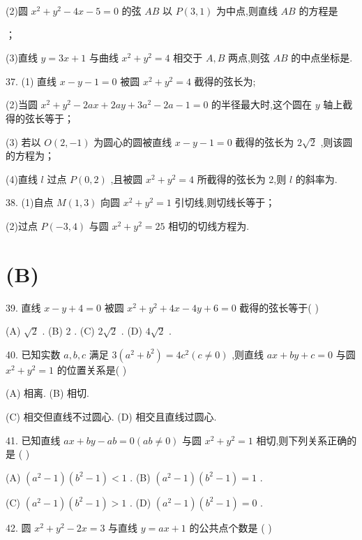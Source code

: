 (2)圆 ${x}^{2} + {y}^{2} - {4x} - 5 = 0$ 的弦 ${AB}$ 以 $P\left( {3,1}\right)$ 为中点,则直线 ${AB}$ 的方程是\blkda{}

\blkda{}；

(3)直线 $y = {3x} + 1$ 与曲线 ${x}^{2} + {y}^{2} = 4$ 相交于 $A,B$ 两点,则弦 ${AB}$ 的中点坐标是\blkda{}.

37. (1) 直线 $x - y - 1 = 0$ 被圆 ${x}^{2} + {y}^{2} = 4$ 截得的弦长为\blkda{};

(2)当圆 ${x}^{2} + {y}^{2} - {2ax} + {2ay} + 3{a}^{2} - {2a} - 1 = 0$ 的半径最大时,这个圆在 $y$ 轴上截得的弦长等于\blkda{}；

(3) 若以 $O\left( {2, - 1}\right)$ 为圆心的圆被直线 $x - y - 1 = 0$ 截得的弦长为 $2\sqrt{2}$ ,则该圆的方程为\blkda{}；

(4)直线 $l$ 过点 $P\left( {0,2}\right)$ ,且被圆 ${x}^{2} + {y}^{2} = 4$ 所截得的弦长为 2,则 $l$ 的斜率为\blkda{}.

38. (1)自点 $M\left( {1,3}\right)$ 向圆 ${x}^{2} + {y}^{2} = 1$ 引切线,则切线长等于\blkda{}；

(2)过点 $P\left( {-3,4}\right)$ 与圆 ${x}^{2} + {y}^{2} = {25}$ 相切的切线方程为\blkda{}.

\section*{(B)}

39. 直线 $x - y + 4 = 0$ 被圆 ${x}^{2} + {y}^{2} + {4x} - {4y} + 6 = 0$ 截得的弦长等于(   )

(A) $\sqrt{2}$ . (B) 2 . (C) $2\sqrt{2}$ . (D) $4\sqrt{2}$ .

40. 已知实数 $a,b,c$ 满足 $3\left( {{a}^{2} + {b}^{2}}\right)  = 4{c}^{2}\left( {c \neq  0}\right)$ ,则直线 ${ax} + {by} + c = 0$ 与圆 ${x}^{2} + {y}^{2} = 1$ 的位置关系是(   )

(A) 相离. (B) 相切.

(C) 相交但直线不过圆心. (D) 相交且直线过圆心.

41. 已知直线 ${ax} + {by} - {ab} = 0\left( {{ab} \neq  0}\right)$ 与圆 ${x}^{2} + {y}^{2} = 1$ 相切,则下列关系正确的是 (   )

(A) $\left( {{a}^{2} - 1}\right) \left( {{b}^{2} - 1}\right)  < 1$ . (B) $\left( {{a}^{2} - 1}\right) \left( {{b}^{2} - 1}\right)  = 1$ .

(C) $\left( {{a}^{2} - 1}\right) \left( {{b}^{2} - 1}\right)  > 1$ . (D) $\left( {{a}^{2} - 1}\right) \left( {{b}^{2} - 1}\right)  = 0$ .

42. 圆 ${x}^{2} + {y}^{2} - {2x} = 3$ 与直线 $y = {ax} + 1$ 的公共点个数是 (   )

